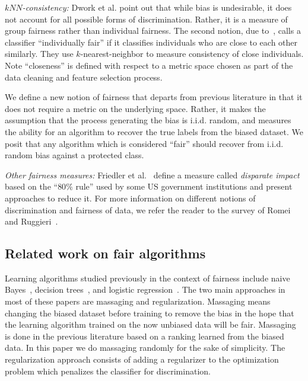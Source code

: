 \documentclass[conference]{IEEEtran}
\begin{document}
\emph{$kNN$-consistency:} Dwork et al. \cite{DworkHPR12} point out that while
bias is undesirable, it does not account for all possible forms of
discrimination.  Rather, it is a measure of group fairness rather than
individual fairness. The second notion, due to~\cite{DworkHPR12}, calls a
classifier ``individually fair'' if it classifies individuals who are close to
each other similarly. They use $k$-nearest-neighbor to measure consistency of
close individuals. Note ``closeness'' is defined with respect to a metric space
chosen as part of the data cleaning and feature selection process. 

We define a new notion of fairness that departs from previous literature in
that it does not require a metric on the underlying space. Rather, it makes the
assumption that the process generating the bias is i.i.d. random, and measures
the ability for an algorithm to recover the true labels from the biased
dataset. We posit that any algorithm which is considered ``fair'' should
recover from i.i.d. random bias against a protected class.

\emph{Other fairness measures:} 
Friedler et al.~\cite{FriedlerSV14} define a measure called \emph{disparate
impact} based on the ``$80\%$ rule'' used by some US government institutions
and present approaches to reduce it.  For more information on different notions
of discrimination and fairness of data, we refer the reader to the survey of
Romei and Ruggieri~\cite{RomeiR14}.

\subsection{Related work on fair algorithms}
Learning algorithms studied previously in the context of fairness include naive
Bayes~\cite{CaldersV10}, decision trees~\cite{KamiranCP10}, and logistic
regression~\cite{KamishimaAAS12}.  The two main approaches in most of these
papers are massaging and regularization. Massaging means changing the biased
dataset before training to remove the bias in the hope that the learning
algorithm trained on the now unbiased data will be fair.  Massaging is done
in the previous literature based on a ranking learned from the biased data.  In
this paper we do massaging randomly for the sake of simplicity.  The
regularization approach consists of adding a regularizer to the optimization
problem which penalizes the classifier for discrimination.
\end{document}
